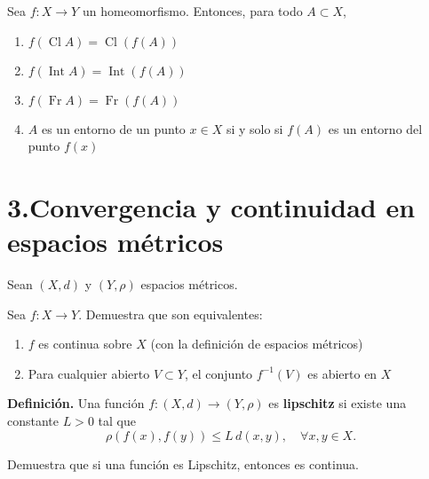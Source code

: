 \documentclass[b5paper,10pt,twoside]{book}
\begin{document}
\begin{problem}
 Sea \( f : X \to Y \) un homeomorfismo. Entonces, para todo \( A \subset X \),
\begin{enumerate}[label=(\roman*)]
    \item \( f(\operatorname{Cl} A) = \operatorname{Cl}(f(A)) \)
    \item \( f(\operatorname{Int} A) = \operatorname{Int}(f(A)) \)
    \item \( f(\operatorname{Fr} A) = \operatorname{Fr}(f(A)) \)
    \item \( A \) es un entorno de un punto \( x \in X \) si y solo si \( f(A) \) es un entorno del punto \( f(x) \)
\end{enumerate}
\end{problem}

\section*{3.\enspace Convergencia y continuidad en espacios métricos}

Sean \(  (X, d) \) y \( (Y, \rho) \)
espacios métricos.

\begin{problem}
Sea \( f : X \to Y \).
Demuestra que son equivalentes:
\begin{enumerate}[label=(\roman*)]
    \item \( f \) es continua sobre \( X \) (con la definición de espacios métricos)
    \item Para cualquier abierto \( V \subset Y \), el conjunto  \( f^{-1}(V) \) es abierto en \( X \)
\end{enumerate}

\end{problem}

\noindent
\textbf{Definición.}
Una función \( f : (X, d) \to (Y, \rho) \) es \textbf{lipschitz} si existe una constante \( L > 0 \) tal que 
\[
\rho(f(x), f(y)) \leq L \, d(x, y), \quad \forall x, y \in X.
\]

\begin{problem}
Demuestra que si una función es Lipschitz, entonces es continua.
\end{problem}
\end{document}
